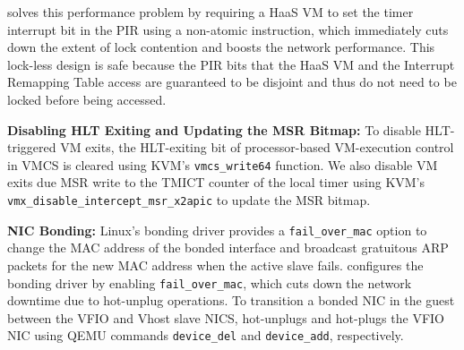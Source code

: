 \na solves this performance problem by requiring a HaaS VM to set the timer interrupt bit
in the PIR using a non-atomic instruction, which immediately cuts down the extent of lock contention
and boosts the network performance. This lock-less design is safe because the PIR bits 
that the HaaS VM and the Interrupt Remapping Table access are guaranteed to be 
disjoint and thus do not need to be locked before being accessed.

{\bf Disabling HLT Exiting and Updating the MSR Bitmap:}
To disable HLT-triggered VM exits, the HLT-exiting bit of
processor-based VM-execution control in VMCS is cleared
using KVM's \texttt{vmcs\_write64} function.
We also disable VM exits due MSR write to the TMICT counter of the local timer
using KVM's \texttt{vmx\_disable\_intercept\_msr\_x2apic} to update the MSR bitmap. 


{\bf NIC Bonding:}
Linux's bonding driver provides a \texttt{fail\_over\_mac} option to change 
the MAC address of the bonded interface and broadcast gratuitous ARP packets for the new MAC address 
when the active slave fails. \na configures the bonding driver by enabling 
\texttt{fail\_over\_mac}, which cuts down the
network downtime due to hot-unplug operations.
To transition a bonded NIC in the guest between the VFIO and Vhost slave NICS, \na hot-unplugs and hot-plugs 
the VFIO NIC using QEMU commands \texttt{device\_del} and \texttt{device\_add}, respectively.






